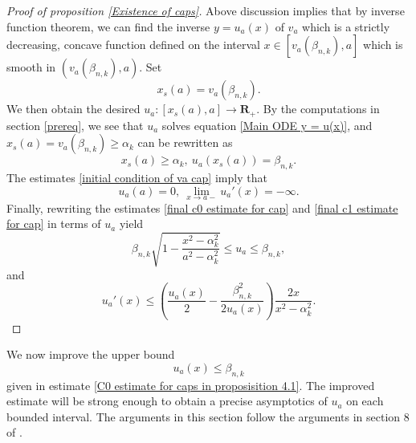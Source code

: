 \documentclass[pdflatex,sn-mathphys-num]{sn-jnl}
\begin{document}
\begin{proof}[Proof of proposition \ref{Existence of caps}]
Above discussion implies that by inverse function theorem, we can find the inverse $y = u_a(x)$ of $v_a$ which is a strictly decreasing, concave function defined on the interval $x \in [v_a(\beta_{n,k}), a]$ which is smooth in $(v_a(\beta_{n,k}), a)$. Set $$x_{s}(a) = v_a(\beta_{n,k}).$$ We then obtain the desired $u_a : [x_{s}(a), a] \to \mathbf{R}_+$. By the computations in section \ref{prereq}, we see that $u_a$ solves equation \eqref{Main ODE y = u(x)}, and $x_{s}(a) = v_a(\beta_{n,k}) \geq \alpha_k$ can be rewritten as
$$x_{s}(a) \geq \alpha_k, \ u_a(x_{s}(a)) = \beta_{n,k}.$$
The estimates \eqref{initial condition of va cap} imply that
\begin{equation}
    u_a(a) = 0, \ \lim_{x \to a-}u_a'(x) = -\infty.
\end{equation}
Finally, rewriting the estimates \eqref{final c0 estimate for cap} and \eqref{final c1 estimate for cap} in terms of $u_a$ yield
\begin{equation}
    \beta_{n,k}\sqrt{1 - \frac{x^2 - \alpha_k^2}{a^2 - \alpha_k^2}} \leq u_a \leq \beta_{n,k},
\end{equation}
and
\begin{equation}
    u_a'(x) \leq (\frac{u_a(x)}{2} - \frac{\beta_{n,k}^2}{2u_a(x)})\frac{2x}{x^2 - \alpha_k^2} .
\end{equation}
\end{proof}

We now improve the upper bound 
$$u_a(x) \leq \beta_{n,k}$$
given in estimate \eqref{C0 estimate for caps in proposisition 4.1}. The improved estimate will be strong enough to obtain a precise asymptotics of $u_a$ on each bounded interval. The arguments in this section follow the arguments in section 8 of \cite{ADS}. \\
\end{document}
